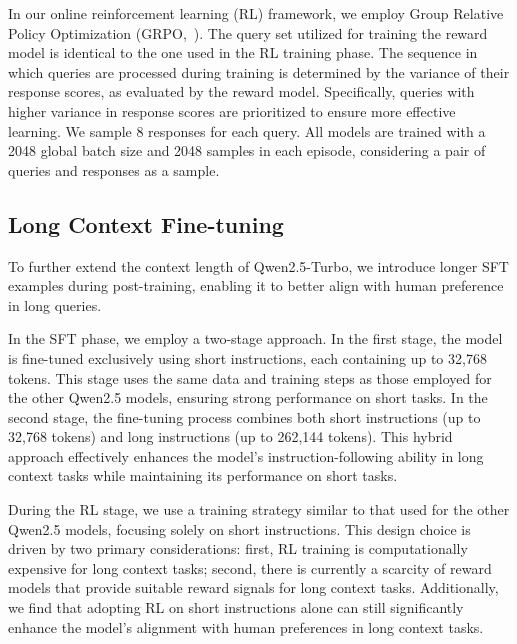 In our online reinforcement learning (RL) framework, we employ Group Relative Policy Optimization (GRPO,~\citealp{deepseekmath}). The query set utilized for training the reward model is identical to the one used in the RL training phase. The sequence in which queries are processed during training is determined by the variance of their response scores, as evaluated by the reward model. Specifically, queries with higher variance in response scores are prioritized to ensure more effective learning.
We sample 8 responses for each query. All models are trained with a 2048 global batch size and 2048 samples in each episode, considering a pair of queries and responses as a sample. 





\subsection{Long Context Fine-tuning}


To further extend the context length of Qwen2.5-Turbo, we introduce longer SFT examples during post-training, enabling it to better align with human preference in long queries.

In the SFT phase, we employ a two-stage approach. In the first stage, the model is fine-tuned exclusively using short instructions, each containing up to 32,768 tokens. This stage uses the same data and training steps as those employed for the other Qwen2.5 models, ensuring strong performance on short tasks. In the second stage, the fine-tuning process combines both short instructions (up to 32,768 tokens) and long instructions (up to 262,144 tokens). This hybrid approach effectively enhances the model's instruction-following ability in long context tasks while maintaining its performance on short tasks.



During the RL stage, we use a training strategy similar to that used for the other Qwen2.5 models, focusing solely on short instructions. This design choice is driven by two primary considerations: first, RL training is computationally expensive for long context tasks; second, there is currently a scarcity of reward models that provide suitable reward signals for long context tasks. Additionally, we find that adopting RL on short instructions alone can still significantly enhance the model's alignment with human preferences in long context tasks.

































